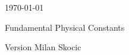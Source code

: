 \begin{titlepage}
\centering
\today
\vfill
{\Huge \textsc{\FPMNAME} \par}
{\Large Fundamental Physical Constants \par}
\hrulefill \par
{Version \FPMVERSION}
\vfill
{\large Milan Skocic}
\vspace{1cm}
\end{titlepage}

